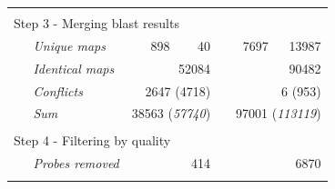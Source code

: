 \begin{table}
\begin{threeparttable}
\begin{footnotesize}
\begin{tabular}{@{}p{3cm}r|rcr|r}
	\multicolumn{6}{l}{}\\
				
		\multicolumn{6}{l}{Step 3 - Merging blast results\tnote{8}} \\[.2ex]
	{\it ~~~Unique maps\tnote{9}} & 898 & 40 && 7697 & 13987 \\
	{\it ~~~Identical maps\tnote{10}} & 
			\multicolumn{2}{r}{52084} && \multicolumn{2}{r}{90482} \\
	{\it ~~~Conflicts\tnote{11}} & 
			\multicolumn{2}{r}{2647 (4718)} && \multicolumn{2}{r}{6 (953)} \\
	{\it ~~~Sum\tnote{12}} & 
			\multicolumn{2}{r}{38563 (\textit{57740})} && 
			\multicolumn{2}{r}{97001 (\textit{113119})} \\

	\multicolumn{6}{l}{}\\

		\multicolumn{6}{l}{Step 4 - Filtering by quality} \\[.2ex]
	{\it ~~~Probes removed} & \multicolumn{2}{r}{414} && 
			\multicolumn{2}{r}{6870} \\

	\multicolumn{6}{l}{}\\
		

\end{tabular}
\end{footnotesize}
\end{threeparttable}
\end{table}
